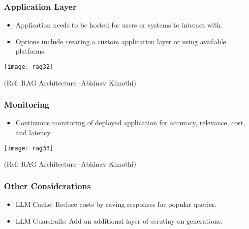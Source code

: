 \begin{frame}[fragile]\frametitle{Application Layer}
    \begin{itemize}
        \item Application needs to be hosted for users or systems to interact with.
        \item Options include creating a custom application layer or using available platforms.
    \end{itemize}
	
	\begin{center}
	\texttt{[image: rag32]}
	
	{\tiny (Ref: RAG Architecture -Abhinav  Kimothi)}
	\end{center}
	
\end{frame}

\begin{frame}[fragile]\frametitle{Monitoring}
    \begin{itemize}
        \item Continuous monitoring of deployed application for accuracy, relevance, cost, and latency.
    \end{itemize}
	
	\begin{center}
	\texttt{[image: rag33]}
	
	{\tiny (Ref: RAG Architecture -Abhinav  Kimothi)}
	\end{center}	
\end{frame}

\begin{frame}[fragile]\frametitle{Other Considerations}
    \begin{itemize}
        \item LLM Cache: Reduce costs by saving responses for popular queries.
        \item LLM Guardrails: Add an additional layer of scrutiny on generations.
    \end{itemize}
\end{frame}

